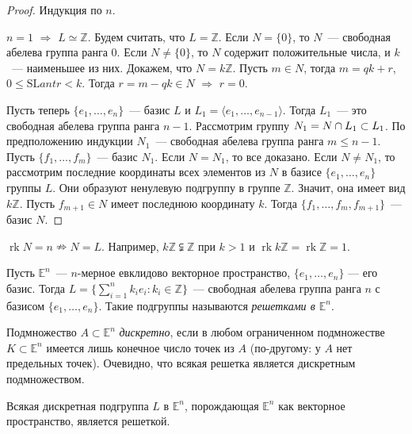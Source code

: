 \documentclass[a4paper]{article}
\newcommand{\rk}{\mathop{\mathrm{rk}}\nolimits}
\newcommand*{\p}[1]{#1\nobreak\discretionary{}{\hbox{$\mathsurround=0pt #1$}}{}}
\begin{document}
\begin{proof}
Индукция по $n$.

$n=1$ $\Rightarrow$ $L\simeq\mathbb{Z}$. Будем считать, что
$L=\mathbb{Z}$. Если $N=\{0\}$, то $N$~--- свободная абелева группа
ранга 0. Если $N\neq\{0\}$, то $N$ содержит положительные числа, и
$k$~--- наименьшее из них. Докажем, что $N=k\mathbb{Z}$. Пусть $m\in
N$, тогда $m=qk+r$, $0\leq\mathrm{SL}ant r<k$. Тогда $r=m-qk\in N$
$\Rightarrow$ $r=0$.

Пусть теперь $\{e_1,\ldots,e_n\}$~--- базис $L$ и $L_1=\langle
e_1,\ldots,e_{n-1}\rangle$. Тогда $L_1$~--- это свободная абелева
группа ранга $n-1$. Рассмотрим группу $N_1\p=N\p\cap L_1\subset
L_1$. По предположению индукции $N_1$~--- свободная абелева группа
ранга $m\leqslant n-1$. Пусть $\{f_1,\ldots,f_m\}$~--- базис $N_1$.
Если $N=N_1$, то все доказано. Если $N\neq N_1$, то рассмотрим
последние координаты всех элементов из $N$ в базисе
$\{e_1,\ldots,e_n\}$ группы $L$. Они образуют ненулевую подгруппу в
группе $\mathbb{Z}$. Значит, она имеет вид $k\mathbb{Z}$. Пусть
$f_{m+1}\in N$ имеет последнюю координату $k$. Тогда
$\{f_1,\ldots,f_m,f_{m+1}\}$~--- базис $N$.
\end{proof}

\begin{zam}
$\rk N=n\nRightarrow N=L$. Например, $k\mathbb{Z}\subsetneqq
\mathbb{Z}$ при $k>1$ и $\rk k\mathbb{Z}=\rk\mathbb{Z}=1$.
\end{zam}

Пусть $\mathbb{E}^n$~--- $n$-мерное евклидово векторное
пространство, $\{e_1,\ldots,e_n\}$ --- его базис. Тогда
$L=\Big\{\sum\limits_{i=1}^n k_ie_i: k_i\in\mathbb{Z}\Big\}$~---
свободная абелева группа ранга $n$ с базисом $\{e_1,\ldots,e_n\}$.
Такие подгруппы называются \emph{решетками в $\mathbb{E}^n$}.

Подмножество $A\subset\mathbb{E}^n$ \emph{дискретно}, если в любом
ограниченном подмножестве $K\subset\mathbb{E}^n$ имеется лишь
конечное число точек из $A$ (по-другому: у $A$ нет предельных
точек). Очевидно, что всякая решетка является дискретным
подмножеством.

\begin{theorem}
\label{2.IV}Всякая дискретная подгруппа $L$ в $\mathbb{E}^n$,
порождающая $\mathbb{E}^n$ как векторное пространство, является
решеткой.
\end{theorem}
\end{document}
